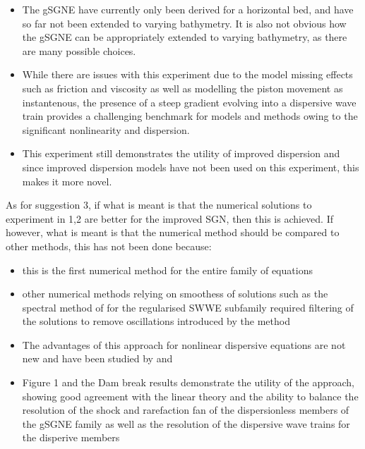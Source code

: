\documentclass[10pt]{article}
\begin{document}
\begin{itemize}
	\item The gSGNE have currently only been derived for a horizontal bed, and have so far not been extended to varying bathymetry. It is also not obvious how the gSGNE can be appropriately extended to varying bathymetry, as there are many possible choices. 
	\item While there are issues with this experiment due to  the model missing effects such as friction and viscosity as well as modelling the piston movement as instantenous, the presence of a steep gradient evolving into a dispersive wave train provides a challenging benchmark for models and methods owing to the significant nonlinearity and dispersion. 
	\item This experiment still demonstrates the utility of improved dispersion and since improved dispersion models have not been used on this experiment, this makes it more novel. 
\end{itemize}

As for suggestion 3, if what is meant is that the numerical solutions to experiment in 1,2 are better for the improved SGN, then this is achieved. If however, what is meant is that the numerical method should be compared to other methods, this has not been done because:
\begin{itemize}
	\item this is the first numerical method for the entire family of equations
	\item other numerical methods relying on smoothess of solutions such as the spectral method of \cite{Dutykh-etal-2018-371} for the regularised SWWE subfamily required filtering of the solutions to remove oscillations introduced by the method
	\item The advantages of this approach for nonlinear dispersive equations are not new and have been studied by \citet{Pitt-2019} and \citet{Pitt-2018-61}
	\item Figure 1 and the Dam break results demonstrate the utility of the approach, showing good agreement with the linear theory and the ability to balance the resolution of the shock and rarefaction fan of the dispersionless members of the gSGNE family as well as the resolution of the dispersive wave trains for the disperive members
\end{itemize}


 

\end{document}
